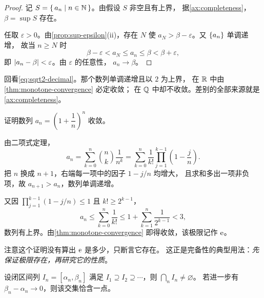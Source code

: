 \begin{proof}
  记 \(S = \left\{\,a_{n} \;\middle|\; n \in \mathbb{N}\,\right\}\)。由假设 \(S\) 非空且有上界，
  据\cref{ax:completeness}，\(\beta = \sup S\) 存在。

  任取 \(\varepsilon > 0\)。由\cref{prop:sup-epsilon}(ii)，存在 \(N\) 使
  \(a_{N} > \beta - \varepsilon\)。又 \(\{a_{n}\}\) 单调递增，
  故当 \(n \ge N\) 时
  \begin{equation}
    \label{eq:monotone-squeeze}
    \beta - \varepsilon < a_{N} \le a_{n} \le \beta < \beta + \varepsilon,
  \end{equation}
  即 \(\lvert a_{n} - \beta\rvert < \varepsilon\)。由 \(\varepsilon\) 的任意性，
  \(a_{n} \to \beta\)。
\end{proof}

\begin{remark}
  回看\cref{eq:sqrt2-decimal}。那个数列单调递增且以 \(2\) 为上界，
  在 \(\mathbb{R}\) 中由\cref{thm:monotone-convergence} 必定收敛；
  在 \(\mathbb{Q}\) 中却不收敛。差别的全部来源就是\cref{ax:completeness}。
\end{remark}

\begin{example}[自然常数的存在性]
  \label{ex:e-limit}
  证明数列 \(a_{n} = \left(1 + \dfrac{1}{n}\right)^{n}\) 收敛。
  \begin{worked}
    由二项式定理，
    \[
      a_{n} = \sum_{k=0}^{n} \binom{n}{k} \frac{1}{n^{k}}
            = \sum_{k=0}^{n} \frac{1}{k!}
              \prod_{j=1}^{k-1}\left(1 - \frac{j}{n}\right).
    \]
    把 \(n\) 换成 \(n+1\)，右端每一项中的因子 \(1 - j/n\) 均增大，
    且求和多出一项非负项，故 \(a_{n+1} > a_{n}\)，数列单调递增。

    又因 \(\prod_{j=1}^{k-1}(1 - j/n) \le 1\) 且 \(k! \ge 2^{k-1}\)，
    \[
      a_{n} \le \sum_{k=0}^{n} \frac{1}{k!}
            \le 1 + \sum_{k=1}^{n} \frac{1}{2^{k-1}} < 3,
    \]
    数列有上界。由\cref{thm:monotone-convergence} 即得收敛，该极限记作 \(\mathrm{e}\)。

    注意这个证明没有算出 \(\mathrm{e}\) 是多少，只断言它存在。
    这正是完备性的典型用法：\emph{先保证极限存在，再研究它的性质}。
  \end{worked}
\end{example}

\begin{theorem}[闭区间套定理]
  \label{thm:nested-intervals}
  设闭区间列 \(I_{n} = [\alpha_{n}, \beta_{n}]\) 满足
  \(I_{1} \supseteq I_{2} \supseteq \cdots\)，则 \(\bigcap_{n} I_{n} \neq \varnothing\)。
  若进一步有 \(\beta_{n} - \alpha_{n} \to 0\)，则该交集恰含一点。
\end{theorem}

